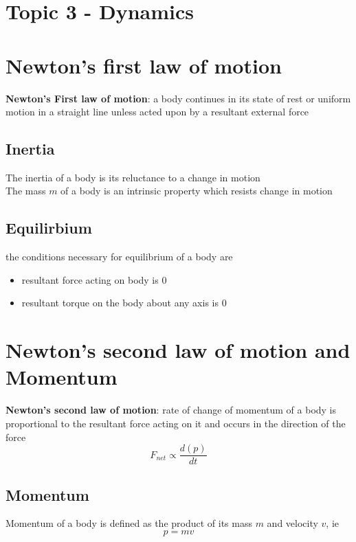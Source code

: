 \documentclass[a4paper, 10pt]{article}
\begin{document}
\section*{Topic 3 - Dynamics}
\section{Newton's first law of motion}

\begin{framed}
   \textbf{Newton's First law of motion}: a body continues in its state of rest or uniform motion in a straight line unless acted upon by a resultant external force
\end{framed}	

\subsection{Inertia}
The inertia of a body is its reluctance to a change in motion  \\

The mass $m$ of a body is an intrinsic property which resists change in motion

\subsection{Equilirbium}
the conditions necessary for equilibrium of a body are 
\begin{itemize}
   \item resultant force acting on body is 0
   \item resultant torque on the body about any axis is 0
\end{itemize}	


\section{Newton's second law of motion and Momentum}
\begin{framed}
   \textbf{Newton's second law of motion}: rate of change of momentum of a body is proportional to the resultant force acting on it and occurs in the direction of the force
  \[
     F_{net} \propto \frac{d(p)}{dt}
  \]
   
\end{framed}	

\subsection{Momentum}
Momentum of a body is defined as the product of its mass $m$ and velocity $v$, ie 
\[
   p = mv 
\]
\end{document}
